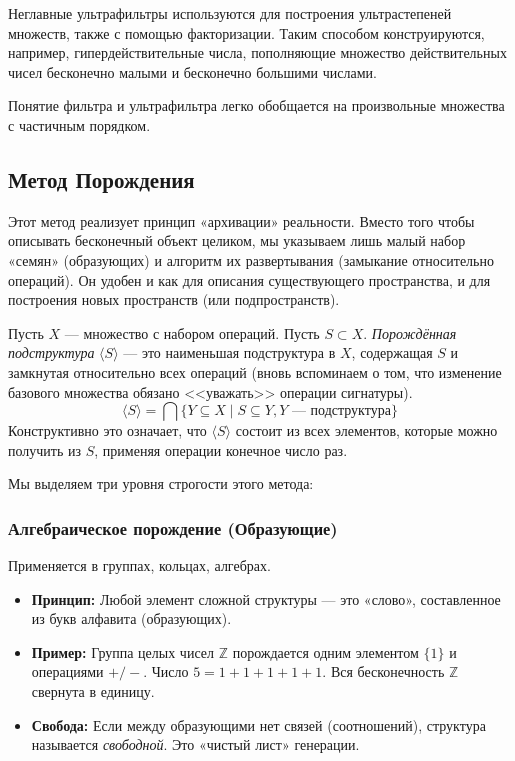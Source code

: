 \documentclass[11pt, a4paper]{extarticle}
\newcommand{\Z}{{\mathbb Z}}
\begin{document}
Неглавные ультрафильтры используются для построения ультрастепеней множеств, также с помощью факторизации. Таким способом конструируются, например, гипердействительные числа, пополняющие множество действительных чисел бесконечно малыми и бесконечно большими числами.

Понятие фильтра и ультрафильтра легко обобщается на произвольные множества с частичным порядком.


\subsection{Метод Порождения}

Этот метод реализует принцип «архивации» реальности. Вместо того чтобы описывать бесконечный объект целиком, мы указываем лишь малый набор «семян» (образующих) и алгоритм их развертывания (замыкание относительно операций). Он удобен и как для описания существующего пространства, и для построения новых пространств (или подпространств).

\begin{definition}
Пусть $X$ — множество с набором операций. Пусть $S \subset X$.
\textit{Порождённая подструктура} $\langle S \rangle$ — это наименьшая подструктура в $X$, содержащая $S$ и замкнутая относительно всех операций (вновь вспоминаем о том, что изменение базового множества обязано <<уважать>> операции сигнатуры).
$$ \langle S \rangle = \bigcap \{ Y \subseteq X \mid S \subseteq Y, Y \text{ --- подструктура} \} $$
Конструктивно это означает, что $\langle S \rangle$ состоит из всех элементов, которые можно получить из $S$, применяя операции конечное число раз.
\end{definition}

Мы выделяем три уровня строгости этого метода:

\subsubsection{Алгебраическое порождение (Образующие)}
Применяется в группах, кольцах, алгебрах.
\begin{itemize}
    \item \textbf{Принцип:} Любой элемент сложной структуры — это «слово», составленное из букв алфавита (образующих).
    \item \textbf{Пример:} Группа целых чисел $\Z$ порождается одним элементом $\{1\}$ и операциями $+/-$. Число $5 = 1+1+1+1+1$. Вся бесконечность $\Z$ свернута в единицу.
    \item \textbf{Свобода:} Если между образующими нет связей (соотношений), структура называется \textit{свободной}. Это «чистый лист» генерации.
\end{itemize}
\end{document}
